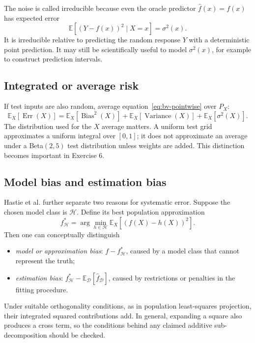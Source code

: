 \documentclass[11pt,a4paper]{article}
\newcommand{\ED}{\mathbb{E}_{\mathcal D}}
\begin{document}
The noise is called irreducible because even the oracle predictor $\widehat f(x)=f(x)$ has expected error
\begin{equation}
  \mathbb E[(Y-f(x))^2\mid X=x]=\sigma^2(x).
\end{equation}
It is irreducible relative to predicting the random response $Y$ with a deterministic point prediction. It may still be scientifically useful to model $\sigma^2(x)$, for example to construct prediction intervals.

\subsection{Integrated or average risk}

If test inputs are also random, average 
equation~\eqref{eq:bv-pointwise} over $P_X$:
\begin{equation}
  \mathbb E_X[\operatorname{Err}(X)]
  =\mathbb E_X[\operatorname{Bias}^2(X)]
   +\mathbb E_X[\operatorname{Variance}(X)]
   +\mathbb E_X[\sigma^2(X)].
  \label{eq:integrated}
\end{equation}
The distribution used for the $X$ average matters. A uniform test grid approximates a uniform integral over $[0,1]$; it does not approximate an average under a Beta$(2,5)$ test distribution unless weights are added. This distinction becomes important in Exercise 6.

\subsection{Model bias and estimation bias}

Hastie et al. further separate two reasons for systematic error. Suppose the chosen model class is $\mathcal H$. Define its best population approximation
\begin{equation}
  f_{\mathcal H}^{*}
  =\arg\min_{h\in\mathcal H}\mathbb E_X[(f(X)-h(X))^2].
\end{equation}
Then one can conceptually distinguish
\begin{itemize}
  \item \emph{model or approximation bias}: $f-f_{\mathcal H}^{*}$, caused by a model class that cannot represent the truth;
  \item \emph{estimation bias}: $f_{\mathcal H}^{*}-\ED[\widehat f_{\mathcal D}]$, caused by restrictions or penalties in the fitting procedure.
\end{itemize}
Under suitable orthogonality conditions, as in population least-squares projection, their integrated squared contributions add. In general, expanding a square also produces a cross term, so the conditions behind any claimed additive sub-decomposition should be checked.
\end{document}
